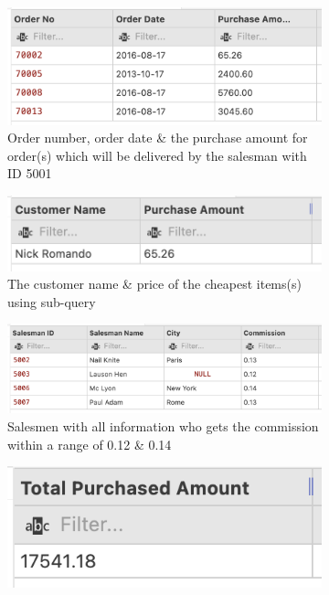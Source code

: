 \captionsetup{justification=centering}
\begin{figure}[H]
    \begin{subfigure}{1\textwidth}
        \centering
        \includegraphics[width=.6\linewidth]{images/output/q1.png}
        \caption*{Order number, order date \& the purchase amount for
            order(s) which will be delivered by the salesman with ID 5001}
        \label{fig:q1}
    \end{subfigure}
    \begin{subfigure}{1\textwidth}
        \centering
        \includegraphics[width=.6\linewidth]{images/output/q2.png}
        \caption*{The customer name \& price of the cheapest items(s) using
            sub-query}
        \label{fig:q2}
    \end{subfigure}
    \vspace*{10mm}
    \begin{subfigure}{1\textwidth}
        \centering
        \includegraphics[width=.6\linewidth]{images/output/q3.png}
        \caption*{Salesmen with all information who gets the commission within a range of 0.12 \& 0.14}
        \label{fig:q3}
    \end{subfigure}
    \vspace*{10mm}
    \begin{subfigure}{.5\textwidth}
        \centering
        \includegraphics[width=.8\linewidth]{images/output/q4.png}

\end{subfigure}
\end{figure}
